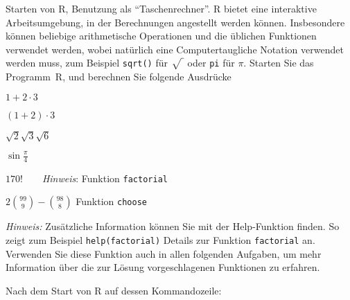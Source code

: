 Starten von R, Benutzung als ``Taschenrechner''.
R bietet eine interaktive Arbeitsumgebung, in der Berechnungen angestellt
werden können. Insbesondere können beliebige arithmetische Operationen
und die üblichen Funktionen verwendet werden, wobei natürlich eine
Computertaugliche Notation verwendet werden muss, zum Beispiel
{\tt sqrt()} für $\sqrt{\mathstrut\;}$ oder {\tt pi} für $\pi$.
Starten Sie das Programm~R, und berechnen Sie folgende Ausdrücke
\begin{teilaufgaben}
\item $1+2\cdot 3$
\item $(1+2)\cdot 3$
\item $\sqrt{2}\sqrt{3}\sqrt{6}$
\item $\sin \frac{\pi}4$
\item $170!\qquad${\it Hinweis\/}: Funktion {\tt factorial}
\item $2\binom{99}{9}-\binom{98}{8}$  Funktion {\tt choose}
\end{teilaufgaben}
{\it Hinweis\/:} Zusätzliche Information können Sie mit der Help-Funktion
finden. So zeigt zum Beispiel {\tt help(factorial)} Details zur Funktion
{\tt factorial} an. Verwenden Sie diese Funktion auch in allen folgenden
Aufgaben, um mehr Information über die zur Lösung vorgeschlagenen
Funktionen zu erfahren.


\begin{loesung}
Nach dem Start von R auf dessen Kommandozeile:
\end{loesung}

